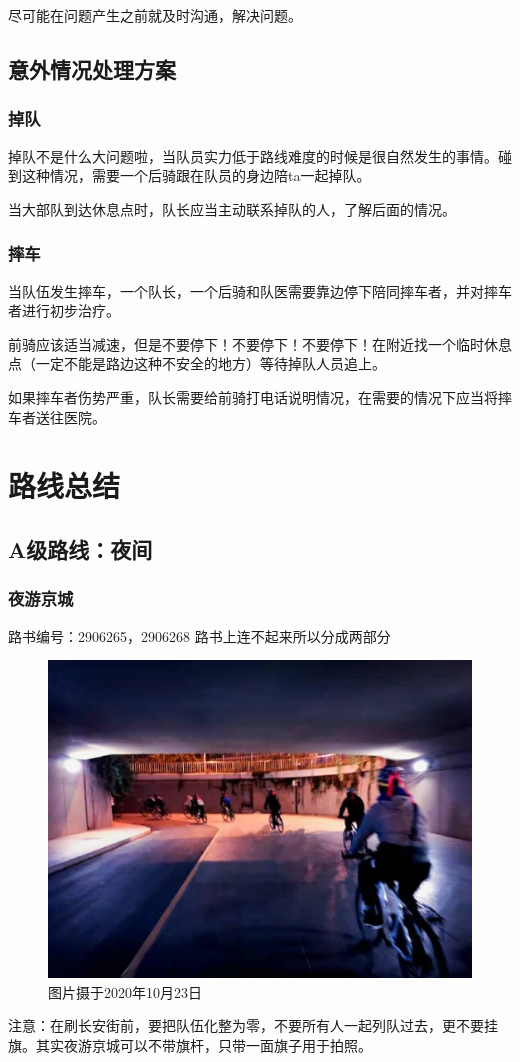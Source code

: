 \documentclass{ctexbook}
\begin{document}
尽可能在问题产生之前就及时沟通，解决问题。
\section{意外情况处理方案}
\subsection{掉队}
掉队不是什么大问题啦，当队员实力低于路线难度的时候是很自然发生的事情。碰到这种情况，需要一个后骑跟在队员的身边陪ta一起掉队。

当大部队到达休息点时，队长应当主动联系掉队的人，了解后面的情况。
\subsection{摔车}
当队伍发生摔车，一个队长，一个后骑和队医需要靠边停下陪同摔车者，并对摔车者进行初步治疗。

前骑应该适当减速，但是不要停下！不要停下！不要停下！在附近找一个临时休息点（一定不能是路边这种不安全的地方）等待掉队人员追上。

如果摔车者伤势严重，队长需要给前骑打电话说明情况，在需要的情况下应当将摔车者送往医院。


\chapter{路线总结}
\section{A级路线：夜间}
\subsection{夜游京城}
路书编号：2906265，2906268 路书上连不起来所以分成两部分

\begin{figure}[htp]
    \centering
    \includegraphics[width=0.7\linewidth]{fig/夜游京城1.jpg}
    \caption{图片摄于2020年10月23日}
\end{figure}
注意：在刷长安街前，要把队伍化整为零，不要所有人一起列队过去，更不要挂旗。其实夜游京城可以不带旗杆，只带一面旗子用于拍照。
\end{document}
